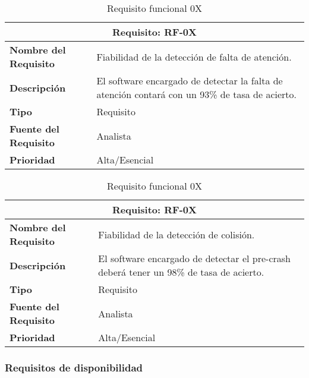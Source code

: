 \begin{table}[H]
\begin{center}
\begin{tabular}{p{} p{7cm}}
\multicolumn{2}{c}{\textbf{Requisito: RF-0X} } \\
\hline \hline
\textbf{Nombre del Requisito} & Fiabilidad de la detección de falta de atención.\\
\hline
\textbf{Descripción} &  El software encargado de detectar la falta de atención contará con un 93\% de tasa de acierto.\\
\hline
\textbf{Tipo} & Requisito  \\
\hline
\textbf{Fuente del Requisito} & Analista  \\
\hline
\textbf{Prioridad} & Alta/Esencial \\ \hline
\end{tabular}
\caption{Requisito funcional 0X}
\label{tab:personal}
\end{center}
\end{table}

\begin{table}[H]
\begin{center}
\begin{tabular}{p{} p{7cm}}
\multicolumn{2}{c}{\textbf{Requisito: RF-0X} } \\
\hline \hline
\textbf{Nombre del Requisito} & Fiabilidad de la detección de colisión.\\
\hline
\textbf{Descripción} & El software encargado de detectar el pre-crash deberá tener un 98\% de tasa de acierto.\\
\hline
\textbf{Tipo} & Requisito  \\
\hline
\textbf{Fuente del Requisito} & Analista  \\
\hline
\textbf{Prioridad} & Alta/Esencial \\ \hline
\end{tabular}
\caption{Requisito funcional 0X}
\label{tab:personal}
\end{center}
\end{table}


\subsubsection{Requisitos de disponibilidad}

